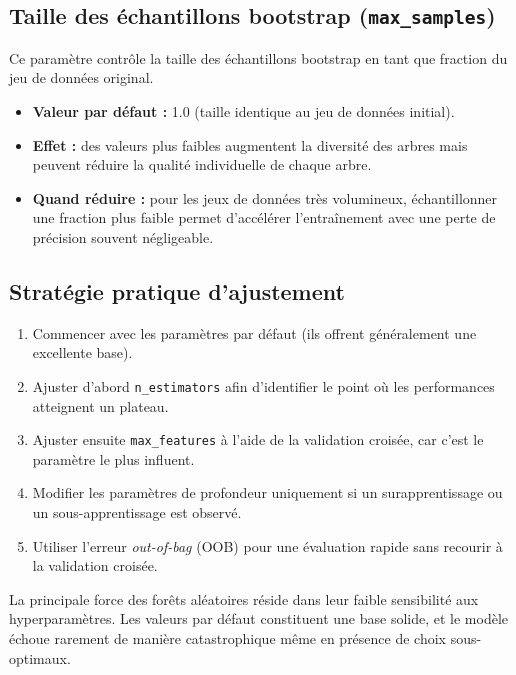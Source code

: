 \subsection{Taille des échantillons bootstrap (\texttt{max\_samples})}

Ce paramètre contrôle la taille des échantillons bootstrap en tant que fraction du jeu de données original.

\begin{itemize}
    \item \textbf{Valeur par défaut :} 1.0 (taille identique au jeu de données initial).
    \item \textbf{Effet :} des valeurs plus faibles augmentent la diversité des arbres mais peuvent réduire la qualité individuelle de chaque arbre.
    \item \textbf{Quand réduire :} pour les jeux de données très volumineux, échantillonner une fraction plus faible permet d’accélérer l’entraînement avec une perte de précision souvent négligeable.
\end{itemize}

\subsection{Stratégie pratique d’ajustement}

\begin{enumerate}
    \item Commencer avec les paramètres par défaut (ils offrent généralement une excellente base).
    \item Ajuster d’abord \texttt{n\_estimators} afin d’identifier le point où les performances atteignent un plateau.
    \item Ajuster ensuite \texttt{max\_features} à l’aide de la validation croisée, car c’est le paramètre le plus influent.
    \item Modifier les paramètres de profondeur uniquement si un surapprentissage ou un sous-apprentissage est observé.
    \item Utiliser l’erreur \emph{out-of-bag} (OOB) pour une évaluation rapide sans recourir à la validation croisée.
\end{enumerate}

La principale force des forêts aléatoires réside dans leur faible sensibilité aux hyperparamètres. Les valeurs par défaut constituent une base solide, et le modèle échoue rarement de manière catastrophique même en présence de choix sous-optimaux.

